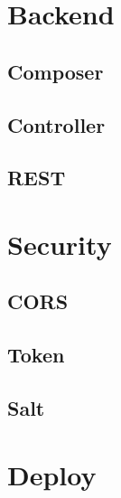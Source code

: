 \section{Backend}

\subsection{Composer}

\subsection{Controller}

\subsection{REST}




\section{Security}

\subsection{CORS}

\subsection{Token}

\subsection{Salt}


\section{Deploy}
